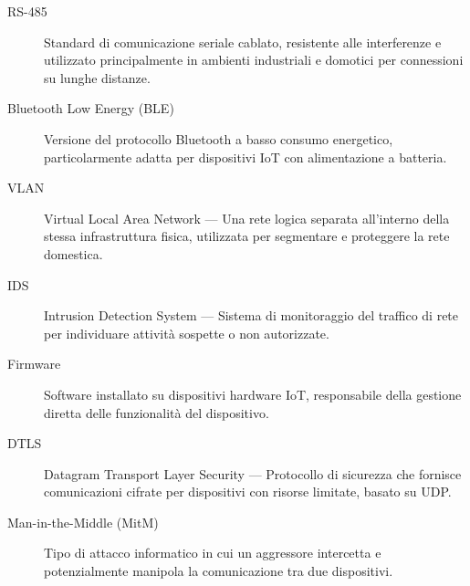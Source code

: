 \begin{description}
    \item[RS-485] Standard di comunicazione seriale cablato, resistente alle interferenze e utilizzato principalmente in ambienti industriali e domotici per connessioni su lunghe distanze.
    \item[Bluetooth Low Energy (BLE)] Versione del protocollo Bluetooth a basso consumo energetico, particolarmente adatta per dispositivi IoT con alimentazione a batteria.

    \item[VLAN] Virtual Local Area Network --- Una rete logica separata all'interno della stessa infrastruttura fisica, utilizzata per segmentare e proteggere la rete domestica.
    \item[IDS] Intrusion Detection System --- Sistema di monitoraggio del traffico di rete per individuare attività sospette o non autorizzate.
    \item[Firmware] Software installato su dispositivi hardware IoT, responsabile della gestione diretta delle funzionalità del dispositivo.
    \item[DTLS] Datagram Transport Layer Security --- Protocollo di sicurezza che fornisce comunicazioni cifrate per dispositivi con risorse limitate, basato su UDP.
    \item[Man-in-the-Middle (MitM)] Tipo di attacco informatico in cui un aggressore intercetta e potenzialmente manipola la comunicazione tra due dispositivi.

\end{description}